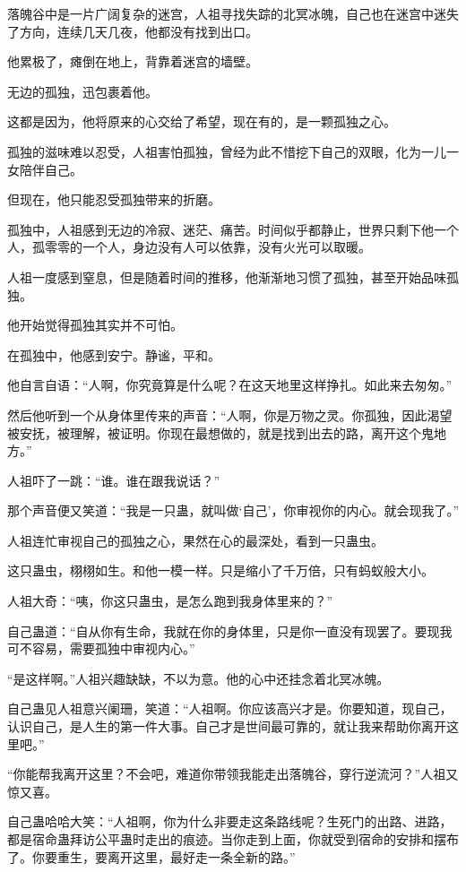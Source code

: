 \begin{this_body}
落魄谷中是一片广阔复杂的迷宫，人祖寻找失踪的北冥冰魄，自己也在迷宫中迷失了方向，连续几天几夜，他都没有找到出口。

他累极了，瘫倒在地上，背靠着迷宫的墙壁。

无边的孤独，迅包裹着他。

这都是因为，他将原来的心交给了希望，现在有的，是一颗孤独之心。

孤独的滋味难以忍受，人祖害怕孤独，曾经为此不惜挖下自己的双眼，化为一儿一女陪伴自己。

但现在，他只能忍受孤独带来的折磨。

孤独中，人祖感到无边的冷寂、迷茫、痛苦。时间似乎都静止，世界只剩下他一个人，孤零零的一个人，身边没有人可以依靠，没有火光可以取暖。

人祖一度感到窒息，但是随着时间的推移，他渐渐地习惯了孤独，甚至开始品味孤独。

他开始觉得孤独其实并不可怕。

在孤独中，他感到安宁。静谧，平和。

他自言自语：“人啊，你究竟算是什么呢？在这天地里这样挣扎。如此来去匆匆。”

然后他听到一个从身体里传来的声音：“人啊，你是万物之灵。你孤独，因此渴望被安抚，被理解，被证明。你现在最想做的，就是找到出去的路，离开这个鬼地方。”

人祖吓了一跳：“谁。谁在跟我说话？”

那个声音便又笑道：“我是一只蛊，就叫做‘自己’，你审视你的内心。就会现我了。”

人祖连忙审视自己的孤独之心，果然在心的最深处，看到一只蛊虫。

这只蛊虫，栩栩如生。和他一模一样。只是缩小了千万倍，只有蚂蚁般大小。

人祖大奇：“咦，你这只蛊虫，是怎么跑到我身体里来的？”

自己蛊道：“自从你有生命，我就在你的身体里，只是你一直没有现罢了。要现我可不容易，需要孤独中审视内心。”

“是这样啊。”人祖兴趣缺缺，不以为意。他的心中还挂念着北冥冰魄。

自己蛊见人祖意兴阑珊，笑道：“人祖啊。你应该高兴才是。你要知道，现自己，认识自己，是人生的第一件大事。自己才是世间最可靠的，就让我来帮助你离开这里吧。”

“你能帮我离开这里？不会吧，难道你带领我能走出落魄谷，穿行逆流河？”人祖又惊又喜。

自己蛊哈哈大笑：“人祖啊，你为什么非要走这条路线呢？生死门的出路、进路，都是宿命蛊拜访公平蛊时走出的痕迹。当你走到上面，你就受到宿命的安排和摆布了。你要重生，要离开这里，最好走一条全新的路。”


\end{this_body}
